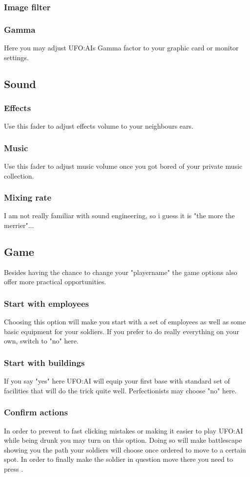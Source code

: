 \subsubsection*{Image filter}
\subsubsection*{Gamma}
Here you may adjust UFO:AIs Gamma factor to your graphic card or monitor settings.

\subsection{Sound}
\subsubsection*{Effects}
Use this fader to adjust effects volume to your neighbours ears.
\subsubsection*{Music}
Use this fader to adjust music volume once you got bored of your private music collection.
\subsubsection*{Mixing rate}
I am not really familiar with sound engineering, so i guess it is "the more the merrier"...

\subsection{Game}
Besides having the chance to change your "playername" the game options also offer more practical opportunities.
\subsubsection*{Start with employees}
Choosing this option will make you start with a set of employees as well as some basic equipment for your soldiers. If you prefer to do really everything on your own, switch to "no" here.
\subsubsection*{Start with buildings}
If you say "yes" here UFO:AI will equip your first base with standard set of facilities that will do the trick quite well. Perfectionists may choose "no" here.
\subsubsection*{Confirm actions}
In order to prevent to fast clicking mistakes or making it easier to play UFO:AI while being drunk you may turn on this option. Doing so will make battlescape showing you the path your soldiers will choose once ordered to move to a certain spot. In order to finally make the soldier in question move there you need to press .
